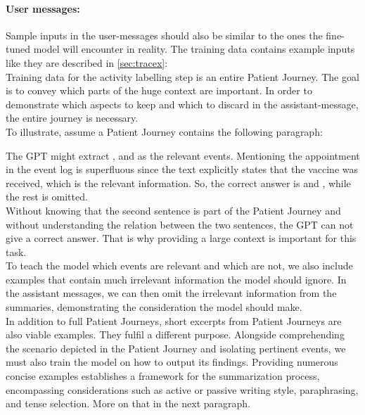 \paragraph{User messages:}\label{par:user-messages} Sample inputs in the user-messages should also be similar to the ones the fine-tuned model will encounter in reality. The training data contains example inputs like they are described in \autoref{sec:tracex}:\\
Training data for the activity labelling step is an entire Patient Journey. The goal is to convey which parts of the huge context are important. In order to demonstrate which aspects to keep and which to discard in the assistant-message, the entire journey is necessary.\\
To illustrate, assume a Patient Journey contains the following paragraph:
\begin{quote}
\end{quote}
The GPT might extract ,  and  as the relevant events. Mentioning the appointment in the event log is superfluous since the text explicitly states that the vaccine was received, which is the relevant information. So, the correct answer is  and , while the rest is omitted.\\
Without knowing that the second sentence is part of the Patient Journey and without understanding the relation between the two sentences, the GPT can not give a correct answer. That is why providing a large context is important for this task.\\
To teach the model which events are relevant and which are not, we also include examples that contain much irrelevant information the model should ignore. In the assistant messages, we can then omit the irrelevant information from the summaries, demonstrating the consideration the model should make.\\
In addition to full Patient Journeys, short excerpts from Patient Journeys are also viable examples. They fulfil a different purpose. Alongside comprehending the scenario depicted in the Patient Journey and isolating pertinent events, we must also train the model on how to output its findings. Providing numerous concise examples establishes a framework for the summarization process, encompassing considerations such as active or passive writing style, paraphrasing, and tense selection. More on that in the next paragraph.\\\\
